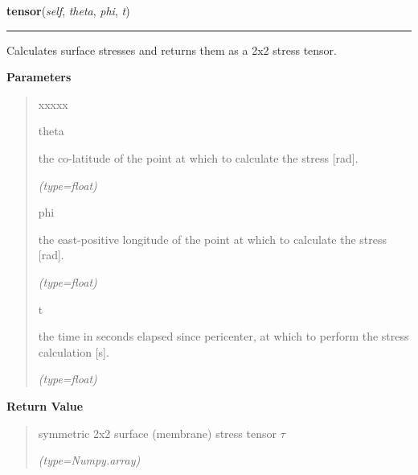     \vspace{0.5ex}

\hspace{.8\funcindent}\begin{boxedminipage}{\funcwidth}

    \raggedright \textbf{tensor}(\textit{self}, \textit{theta}, \textit{phi}, \textit{t})

    \vspace{-1.5ex}

    \rule{\textwidth}{0.5\fboxrule}
\setlength{\parskip}{2ex}
    Calculates surface stresses and returns them as a 2x2 stress tensor.

\setlength{\parskip}{1ex}
      \textbf{Parameters}
      \vspace{-1ex}

      \begin{quote}
        \begin{Ventry}{xxxxx}

          \item[theta]

          the co-latitude of the point at which to calculate the stress 
          [rad].

            {\it (type=float)}

          \item[phi]

          the east-positive longitude of the point at which to calculate 
          the stress [rad].

            {\it (type=float)}

          \item[t]

          the time in seconds elapsed since pericenter, at which to perform
          the stress calculation [s].

            {\it (type=float)}

        \end{Ventry}

      \end{quote}

      \textbf{Return Value}
    \vspace{-1ex}

      \begin{quote}
      symmetric 2x2 surface (membrane) stress tensor \(\tau\)

      {\it (type=Numpy.array)}

      \end{quote}

    \end{boxedminipage}


